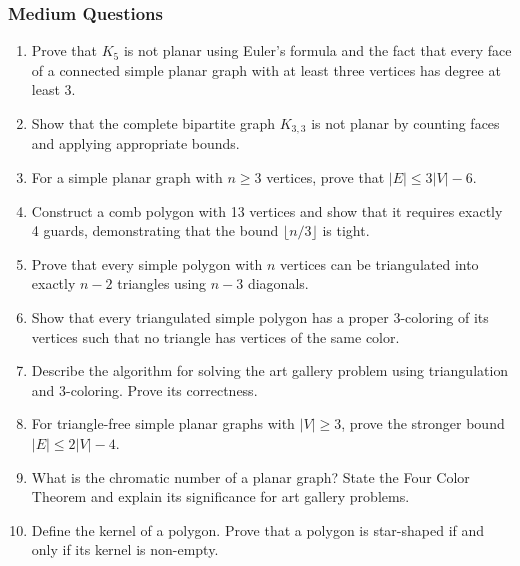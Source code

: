 \documentclass{article}
\theoremstyle{definition}
\begin{document}
\subsubsection{Medium Questions}
\begin{enumerate}[start=11]
\item Prove that $K_5$ is not planar using Euler's formula and the fact that every face of a connected simple planar graph with at least three vertices has degree at least 3.

\item Show that the complete bipartite graph $K_{3,3}$ is not planar by counting faces and applying appropriate bounds.

\item For a simple planar graph with $n \geq 3$ vertices, prove that $|E| \leq 3|V| - 6$.

\item Construct a comb polygon with 13 vertices and show that it requires exactly 4 guards, demonstrating that the bound $\lfloor n/3 \rfloor$ is tight.

\item Prove that every simple polygon with $n$ vertices can be triangulated into exactly $n-2$ triangles using $n-3$ diagonals.

\item Show that every triangulated simple polygon has a proper 3-coloring of its vertices such that no triangle has vertices of the same color.

\item Describe the algorithm for solving the art gallery problem using triangulation and 3-coloring. Prove its correctness.

\item For triangle-free simple planar graphs with $|V| \geq 3$, prove the stronger bound $|E| \leq 2|V| - 4$.

\item What is the chromatic number of a planar graph? State the Four Color Theorem and explain its significance for art gallery problems.

\item Define the kernel of a polygon. Prove that a polygon is star-shaped if and only if its kernel is non-empty.
\end{enumerate}
\end{document}
